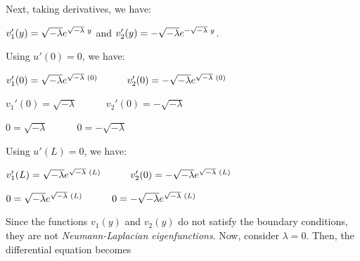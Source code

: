 \documentclass[12pt, executivepaper]{article}
\begin{document}
\begin{flushleft}
\vspace{3mm}

Next, taking derivatives, we have:

\pagebreak

\vspace*{-40mm}

\begin{center}

$v_{1}'(y)=\sqrt{-\lambda}e^{\sqrt{-\lambda} \hspace{1mm} y}$ and $v_{2}'(y)=-\sqrt{-\lambda}e^{-\sqrt{-\lambda} \hspace{1mm} y}$.

\end{center}

Using $u'(0)=0$, we have:

\begin{center}

$v_{1}'(0)=\sqrt{-\lambda}e^{\sqrt{-\lambda} \hspace{1mm} (0)} \quad \quad \quad v_{2}'(0)=-\sqrt{-\lambda}e^{\sqrt{-\lambda} \hspace{1mm} (0)}$

$v_{1}'(0)=\sqrt{-\lambda} \quad \quad \quad v_{2}'(0)=-\sqrt{-\lambda}$

$0=\sqrt{-\lambda} \quad \quad \quad 0=-\sqrt{-\lambda}$

\end{center}

\vspace{3mm}

Using $u'(L)=0$, we have:

\begin{center}

$v_{1}'(L)=\sqrt{-\lambda}e^{\sqrt{-\lambda} \hspace{1mm} (L)} \quad \quad \quad v_{2}'(0)=-\sqrt{-\lambda}e^{\sqrt{-\lambda} \hspace{1mm} (L)}$

$0=\sqrt{-\lambda}e^{\sqrt{-\lambda} \hspace{1mm} (L)} \quad \quad \quad 0=-\sqrt{-\lambda}e^{\sqrt{-\lambda} \hspace{1mm} (L)}$

\end{center}

Since the functions $v_{1}(y)$ and $v_{2}(y)$ do not satisfy the boundary conditions, they are not \textit{Neumann-Laplacian eigenfunctions}.
Now, consider $\lambda=0$. Then, the differential equation becomes


\end{flushleft}
\end{document}
